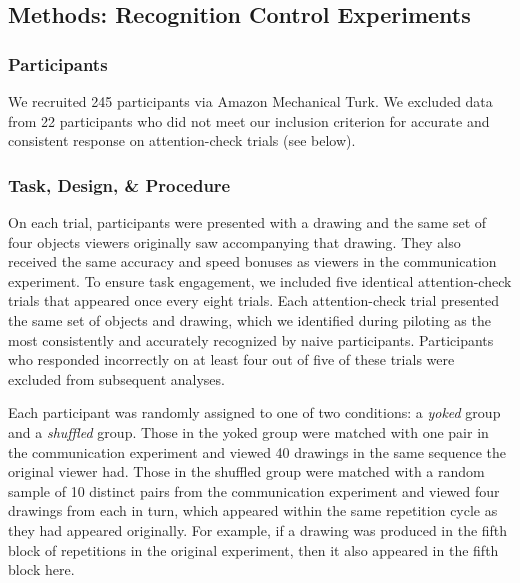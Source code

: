 \documentclass[10pt,letterpaper]{article}
\begin{document}
\subsection{Methods: Recognition Control Experiments}

\subsubsection{Participants}

We recruited 245 participants via Amazon Mechanical Turk.
We excluded data from 22 participants who did not meet our inclusion criterion for accurate and consistent response on attention-check trials (see below).

\subsubsection{Task, Design, \& Procedure}

On each trial, participants were presented with a drawing and the same set of four objects viewers originally saw accompanying that drawing.
They also received the same accuracy and speed bonuses as viewers in the communication experiment.
To ensure task engagement, we included five identical attention-check trials that appeared once every eight trials.
Each attention-check trial presented the same set of objects and drawing, which we identified during piloting as the most consistently and accurately recognized by naive participants.
Participants who responded incorrectly on at least four out of five of these trials were excluded from subsequent analyses.

Each participant was randomly assigned to one of two conditions: a \textit{yoked} group and a \textit{shuffled} group.
Those in the yoked group were matched with one pair in the communication experiment and viewed 40 drawings in the same sequence the original viewer had.
Those in the shuffled group were matched with a random sample of 10 distinct pairs from the communication experiment and viewed four drawings from each in turn, which appeared within the same repetition cycle as they had appeared originally.
For example, if a drawing was produced in the fifth block of repetitions in the original experiment, then it also appeared in the fifth block here.
\end{document}
